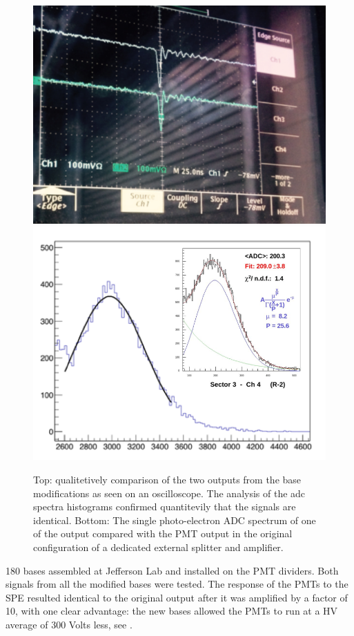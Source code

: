 \begin{figure}
	\centering
	\includegraphics[width=0.87\columnwidth,keepaspectratio]{img/doubleSignal.png}
	\includegraphics[width=0.97\columnwidth,keepaspectratio]{img/fadcOutput.png}
	\caption{Top: qualitetively comparison of the two outputs from the base modifications as seen on an oscilloscope.
				The analysis of the adc spectra histograms confirmed quantitevily that the signals are identical. Bottom:
				The single photo-electron ADC spectrum of one of the output compared with the PMT output in the original
            configuration of a dedicated external splitter and amplifier.
    }
	\label{fig:dividerTests}
\end{figure}

180 bases assembled at Jefferson Lab and installed on the PMT dividers. Both signals from all the modified bases were tested.
The response of the PMTs to the SPE resulted identical to the original output after it was amplified by a factor of 10, with one
clear advantage: the new bases allowed the PMTs to run at a HV average of 300 Volts less, see .



